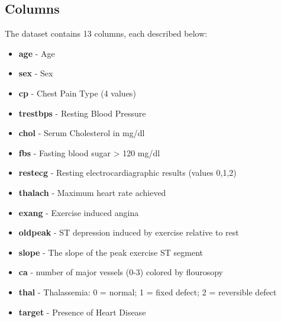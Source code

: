 \documentclass[letter]{article}
\begin{document}
\subsection{Columns}
The dataset contains 13 columns, each described below:
\begin{itemize}
	\item \textbf{age} - Age
	\item \textbf{sex} - Sex
	\item \textbf{cp} - Chest Pain Type (4 values)
	\item \textbf{trestbps} - Resting Blood Pressure
	\item \textbf{chol} - Serum Cholesterol in mg/dl
	\item \textbf{fbs} - Fasting blood sugar > 120 mg/dl
	\item \textbf{restecg} - Resting electrocardiagraphic results (values 0,1,2)
	\item \textbf{thalach} - Maximum heart rate achieved
	\item \textbf{exang} - Exercise induced angina
	\item \textbf{oldpeak} - ST depression induced by exercise relative to rest
	\item \textbf{slope} - The slope of the peak exercise ST segment
	\item \textbf{ca} - number of major vessels (0-3) colored by flourosopy
	\item \textbf{thal} - Thalassemia: 0 = normal; 1 = fixed defect; 2 = reversible defect
	\item \textbf{target} - Presence of Heart Disease
\end{itemize}
\end{document}
